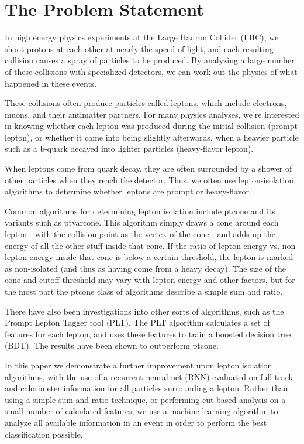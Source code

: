 \chapter{The Problem Statement}


In high energy physics experiments at the Large Hadron Collider (LHC), we shoot protons at each other at nearly the speed of light, and each resulting collision causes a spray of particles to be produced. By analyzing a large number of these collisions with specialized detectors, we can work out the physics of what happened in these events.

These collisions often produce particles called leptons, which include electrons, muons, and their antimatter partners. For many physics analyses, we're interested in knowing whether each lepton was produced during the initial collision (prompt lepton), or whether it came into being slightly afterwards, when a heavier particle such as a b-quark decayed into lighter particles (heavy-flavor lepton).

When leptons come from quark decay, they are often surrounded by a shower of other particles when they reach the detector. Thus, we often use lepton-isolation algorithms to determine whether leptons are prompt or heavy-flavor.


Common algorithms for determining lepton isolation include ptcone and its variants such as ptvarcone. This algorithm simply draws a cone around each lepton - with the collision point as the vertex of the cone - and adds up the energy of all the other stuff inside that cone. If the ratio of lepton energy vs. non-lepton energy inside that cone is below a certain threshold, the lepton is marked as non-isolated (and thus as having come from a heavy decay). The size of the cone and cutoff threshold may vary with lepton energy and other factors, but for the most part the ptcone class of algorithms describe a simple sum and ratio.

There have also been investigations into other sorts of algorithms, such as the Prompt Lepton Tagger tool (PLT). The PLT algorithm calculates a set of features for each lepton, and uses these features to train a boosted decision tree (BDT). The results have been shown to outperform ptcone.


In this paper we demonstrate a further improvement upon lepton isolation algorithms, with the use of a recurrent neural net (RNN) evaluated on full track and calorimeter information for all particles surrounding a lepton. Rather than using a simple sum-and-ratio technique, or performing cut-based analysis on a small number of calculated features, we use a machine-learning algorithm to analyze all available information in an event in order to perform the best classification possible.

